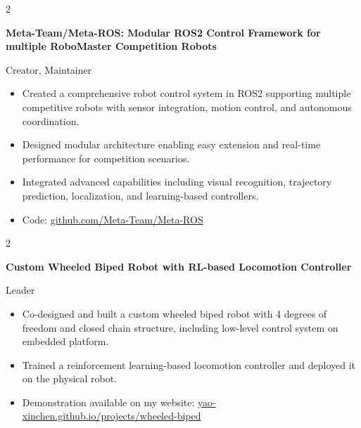 \documentclass[10pt, letterpaper]{article}
\newenvironment{highlights}{
    \begin{itemize}[
        topsep=0.10 cm,
        parsep=0.10 cm,
        partopsep=0pt,
        itemsep=0pt,
        leftmargin=0 cm + 10pt
    ]
}{
    \end{itemize}
} %
\newenvironment{twocolentry}[2][]{
    \onecolentry
    \def\secondColumn{#2}
    \setcolumnwidth{\fill, 4.5 cm}
    \begin{paracol}{2}
}{
    \switchcolumn \raggedleft \secondColumn
    \end{paracol}
    \endonecolentry
} %
\begin{document}
        \begin{twocolentry}{
            Creator, Maintainer
        }
            \textbf{Meta-Team/Meta-ROS: Modular ROS2 Control Framework for multiple RoboMaster Competition Robots}
        \end{twocolentry}

        \vspace{0.10 cm}

        \begin{highlights}
            \item Created a comprehensive robot control system in ROS2 supporting multiple competitive robots with sensor integration, motion control, and autonomous coordination.
            \item Designed modular architecture enabling easy extension and real-time performance for competition scenarios.
            \item Integrated advanced capabilities including visual recognition, trajectory prediction, localization, and learning-based controllers.
            \item Code: \href{https://github.com/Meta-Team/Meta-ROS}{github.com/Meta-Team/Meta-ROS}
        \end{highlights}

        \vspace{0.2 cm}

        \begin{twocolentry}{
            Leader
        }
            \textbf{Custom Wheeled Biped Robot with RL-based Locomotion Controller}
        \end{twocolentry}

        \vspace{0.1 cm}

        \begin{highlights}
            \item Co-designed and built a custom wheeled biped robot with 4 degrees of freedom and closed chain structure, including low-level control system on embedded platform.
            \item Trained a reinforcement learning-based locomotion controller and deployed it on the physical robot.
            \item Demonstration available on my website: \href{https://yao-xinchen.github.io/projects/wheeled-biped}{yao-xinchen.github.io/projects/wheeled-biped}
        \end{highlights}
\end{document}
